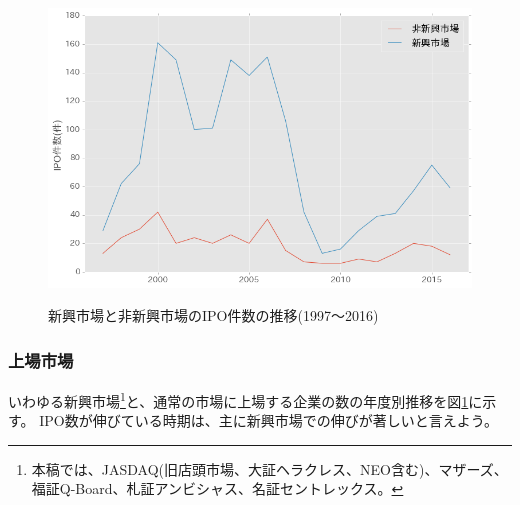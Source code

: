 \documentclass{jsarticle}
\begin{document}
\begin{figure}[!h]
  \begin{center}
  \caption{新興市場と非新興市場のIPO件数の推移(1997〜2016)}
    \includegraphics[clip,width=14cm]{./rising.png}
    \label{rising}
  \end{center}
\end{figure}

\newpage

\subsubsection{上場市場}

いわゆる新興市場\footnote[9]{本稿では、JASDAQ(旧店頭市場、大証ヘラクレス、NEO含む)、マザーズ、福証Q-Board、札証アンビシャス、名証セントレックス。}と、通常の市場に上場する企業の数の年度別推移を図\ref{rising}に示す。 IPO数が伸びている時期は、主に新興市場での伸びが著しいと言えよう。
\end{document}
